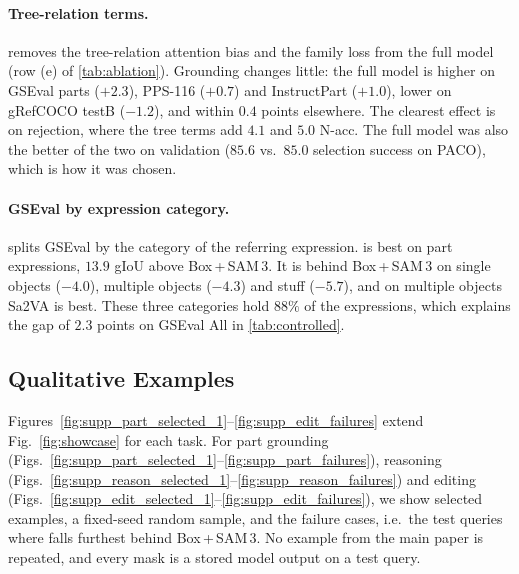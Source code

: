 

\paragraph{Tree-relation terms.}
 removes the tree-relation attention bias and the family loss from the full model (row (e) of
\cref{tab:ablation}). Grounding changes little: the full model is higher on GSEval parts ($+2.3$), PPS-116 ($+0.7$)
and InstructPart ($+1.0$), lower on gRefCOCO testB ($-1.2$), and within $0.4$ points elsewhere. The clearest effect
is on rejection, where the tree terms add $4.1$ and $5.0$ N-acc. The full model was also the better of the two on
validation ($85.6$ vs.\ $85.0$ selection success on PACO), which is how it was chosen.



\paragraph{GSEval by expression category.}
 splits GSEval by the category of the referring expression. \ours{} is best on part
expressions, $13.9$ gIoU above Box\,+\,SAM\,3. It is behind Box\,+\,SAM\,3 on single objects ($-4.0$), multiple
objects ($-4.3$) and stuff ($-5.7$), and on multiple objects Sa2VA is best. These three categories hold $88\%$ of the
expressions, which explains the gap of $2.3$ points on GSEval All in \cref{tab:controlled}.



\FloatBarrier
\subsection{Qualitative Examples}
\label{sec:supp_qual}
Figures~\ref{fig:supp_part_selected_1}--\ref{fig:supp_edit_failures} extend Fig.~\ref{fig:showcase} for each task.
For part grounding (Figs.~\ref{fig:supp_part_selected_1}--\ref{fig:supp_part_failures}), reasoning
(Figs.~\ref{fig:supp_reason_selected_1}--\ref{fig:supp_reason_failures}) and editing
(Figs.~\ref{fig:supp_edit_selected_1}--\ref{fig:supp_edit_failures}), we show selected examples, a fixed-seed random
sample, and the failure cases, i.e.\ the test queries where \ours{} falls furthest behind Box\,+\,SAM\,3. No example
from the main paper is repeated, and every mask is a stored model output on a test query.


